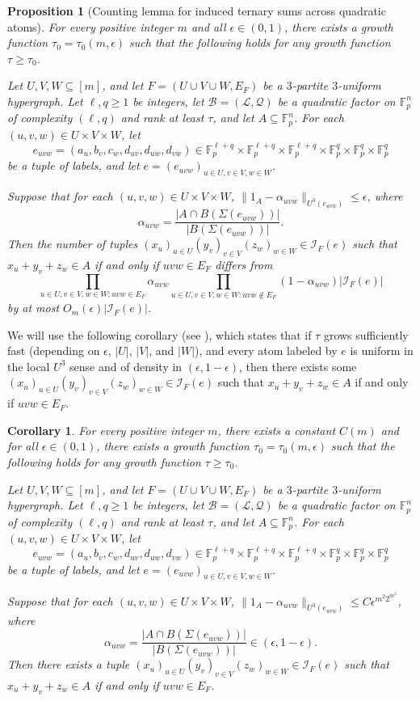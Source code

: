 \documentclass[12pt,oneside,british,a4wide]{amsart}
\newtheorem{corollary}[theorem]{Corollary}
\newtheorem{proposition}[theorem]{Proposition}
\numberwithin{equation}{section}
\theoremstyle{definition}
\def\F{\mathbb{F}}
\def\e{\epsilon}
\newcommand{\calL}{\mathcal{L}}
\newcommand{\calB}{\mathcal{B}}
\newcommand{\calI}{\mathcal{I}}
\newcommand{\calQ}{\mathcal{Q}}
\begin{document}
\begin{proposition}[Counting lemma for induced ternary sums across quadratic atoms]\label{prop:countinggp}
For every positive integer $m$ and all $\e\in (0,1)$, there exists a growth function $\tau_0=\tau_0(m,\e)$ such that the following holds for any growth function $\tau\geq \tau_0$. 

Let $U,V,W\subseteq [m]$, and let $F=(U\cup V\cup W,E_F)$ be a $3$-partite $3$-uniform hypergraph. Let $\ell,q\geq 1$ be integers, let $\calB=(\calL,\calQ)$ be a quadratic factor on $\F_p^n$ of complexity $(\ell,q)$ and rank at least $\tau$, and let $A\subseteq \mathbb{F}_p^n$. For each $(u,v,w)\in U\times V
\times W$,  let 
$$
e_{uvw}=(a_u,b_v,c_w,d_{uv},d_{uw},d_{vw})\in \F_p^{\ell+q}\times \F_p^{\ell+q}\times \F_p^{\ell+q}\times \F_p^q\times \F_p^q\times \F_p^q 
$$
be a tuple of labels, and let $e=(e_{uvw})_{u\in U, v\in V, w\in W }$.

Suppose that for each $(u,v,w)\in U\times V\times W$, $\|1_A-\alpha_{uvw}\|_{U^3(e_{uvw})}\leq \e$, where 
$$
\alpha_{uvw}=\frac{|A\cap B(\Sigma(e_{uvw}))|}{|B(\Sigma(e_{uvw}))|}.
$$
Then
the number of tuples $(x_u)_{u\in U}(y_v)_{v\in V}(z_w)_{w\in W}\in \calI_F(e)$ such that $ x_u+y_v+z_w\in A$ if and only if $uvw\in E_F$ differs from 
\[\prod_{u\in U, v\in V, w\in W: uvw\in E_F}\alpha_{uvw}\prod_{u\in U, v\in V, w\in W: uvw\notin E_F} (1-\alpha_{uvw}) |\calI_F(e)|\]
by at most $O_m(\e)|\calI_F(e)|$.
\end{proposition}


We will use the following corollary (see \cite[Corollary D.12]{Terry.2021d}), which states that if $\tau$ grows sufficiently fast (depending on $\e$, $|U|$, $|V|$, and $|W|$), and every atom labeled by $e$ is uniform in the local $U^3$ sense and of density in $(\e,1-\e)$,  then there exists some $(x_u)_{u\in U}(y_v)_{v\in V}(z_w)_{w\in W}\in \calI_F(e)$ such that $ x_u+y_v+z_w\in A$ if and only if $uvw\in E_F$.

\begin{corollary}\label{cor:countinggp}
For every positive integer $m$, there exists a constant $C(m)$ and for all $\e\in (0,1)$, there exists a growth function $\tau_0=\tau_0(m,\e)$ such that the following holds for any growth function $\tau\geq \tau_0$. 

Let $U,V,W\subseteq [m]$, and let $F=(U\cup V\cup W,E_F)$ be a $3$-partite $3$-uniform hypergraph. Let $\ell,q\geq 1$ be integers, let $\calB=(\calL,\calQ)$ be a quadratic factor on $\F_p^n$ of complexity $(\ell,q)$ and rank at least $\tau$, and let $A\subseteq \mathbb{F}_p^n$. For each $(u,v,w)\in U\times V
\times W$,  let 
$$
e_{uvw}=(a_u,b_v,c_w,d_{uv},d_{uw},d_{vw})\in \F_p^{\ell+q}\times \F_p^{\ell+q}\times \F_p^{\ell+q}\times \F_p^q\times \F_p^q\times \F_p^q 
$$
 be a tuple of labels, and let $e=(e_{uvw})_{u\in U, v\in V, w\in W }$.

Suppose that for each $(u,v,w)\in U\times V\times W$, $\|1_A-\alpha_{uvw}\|_{U^3(e_{uvw})}\leq C \e^{m^2 2^{m^2}}$, where
$$
\alpha_{uvw}=\frac{|A\cap B(\Sigma(e_{uvw}))|}{|B(\Sigma(e_{uvw}))|}\in (\e,1-\e).
$$ 
Then there exists a tuple $(x_u)_{u\in U}(y_v)_{v\in V}(z_w)_{w\in W}\in \calI_F(e)$ such that $ x_u+y_v+z_w\in A$ if and only if $uvw\in E_F$.
\end{corollary}
\end{document}
